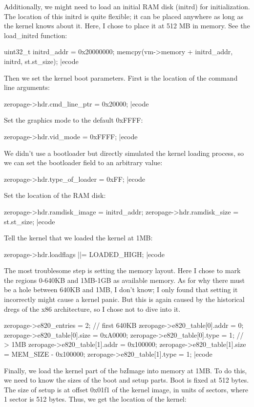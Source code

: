 Additionally, we might need to load an initial RAM disk (initrd) for initialization. The location of this  initrd is quite flexible; it can be placed anywhere as long as the kernel knows about it. Here, I chose to place it at  512 MB in memory. See the  {\itt load\_initrd} function:

\bcode
uint32_t initrd_addr = 0x20000000;
memcpy(vm->memory + initrd_addr, initrd, st.st_size);
|ecode

Then we set the kernel boot parameters. First is the location of the command line arguments:

\bcode
zeropage->hdr.cmd_line_ptr = 0x20000;
|ecode

Set the graphics mode to the default  0xFFFF:

\bcode
zeropage->hdr.vid_mode = 0xFFFF;
|ecode

We didn't use a  bootloader but directly simulated the kernel loading process, so we can set the  bootloader field to an arbitrary value:

\bcode
zeropage->hdr.type_of_loader = 0xFF;
|ecode

Set the location of the RAM disk:

\bcode
zeropage->hdr.ramdisk_image = initrd_addr;
zeropage->hdr.ramdisk_size = st.st_size;
|ecode

Tell the kernel that we loaded the kernel at  1MB:

\bcode
zeropage->hdr.loadflags ||= LOADED_HIGH;
|ecode

The most troublesome step is setting the memory layout. Here I chose to mark the regions  0-640KB and  1MB-1GB as available memory. As for why there must be a hole between  640KB and  1MB, I don't know; I only found that setting it incorrectly might cause a  kernel panic. But this is again caused by the historical dregs of the  x86 architecture, so I chose not to dive into it.

\bcode
zeropage->e820_entries = 2;
// first 640KB
zeropage->e820_table[0].addr = 0;
zeropage->e820_table[0].size = 0xA0000;
zeropage->e820_table[0].type = 1;
// > 1MB
zeropage->e820_table[1].addr = 0x100000;
zeropage->e820_table[1].size = MEM_SIZE - 0x100000;
zeropage->e820_table[1].type = 1;
|ecode

Finally, we load the  kernel part of the  bzImage into memory at  1MB. To do this, we need to know the sizes of the boot and setup parts. Boot is fixed at  512 bytes. The size of  setup is at offset  0x01f1 of the kernel image, in units of sectors, where  1 sector is  512 bytes. Thus, we get the location of the  kernel:

